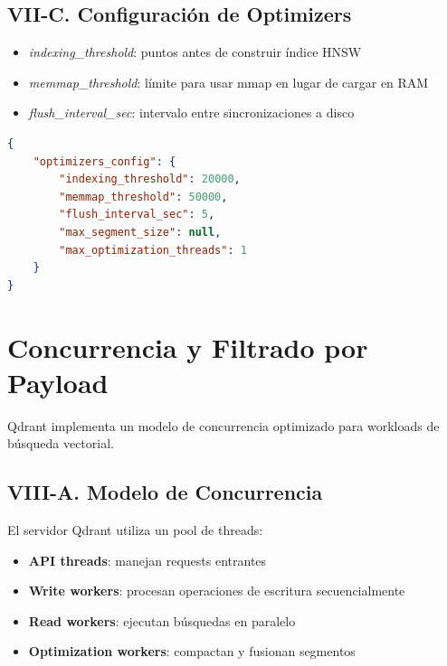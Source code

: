 \documentclass[conference]{IEEEtran}
\newcommand{\param}[1]{\textit{#1}}
\begin{document}
\subsection{VII-C. Configuración de Optimizers}

\begin{itemize}
    \item \param{indexing\_threshold}: puntos antes de construir índice HNSW
    \item \param{memmap\_threshold}: límite para usar mmap en lugar de cargar en RAM
    \item \param{flush\_interval\_sec}: intervalo entre sincronizaciones a disco
\end{itemize}

\begin{lstlisting}[language=json, caption={Configuración de optimizers}]
{
    "optimizers_config": {
        "indexing_threshold": 20000,
        "memmap_threshold": 50000,
        "flush_interval_sec": 5,
        "max_segment_size": null,
        "max_optimization_threads": 1
    }
}
\end{lstlisting}

\section{Concurrencia y Filtrado por Payload}
\label{sec:concurrencia}

Qdrant implementa un modelo de concurrencia optimizado para workloads de búsqueda vectorial.

\subsection{VIII-A. Modelo de Concurrencia}

El servidor Qdrant utiliza un pool de threads:

\begin{itemize}
    \item \textbf{API threads}: manejan requests entrantes
    \item \textbf{Write workers}: procesan operaciones de escritura secuencialmente
    \item \textbf{Read workers}: ejecutan búsquedas en paralelo
    \item \textbf{Optimization workers}: compactan y fusionan segmentos
\end{itemize}
\end{document}
